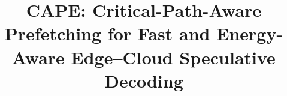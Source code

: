 \documentclass[conference]{IEEEtran}
\begin{document}
\title{CAPE: Critical-Path-Aware Prefetching for Fast and Energy-Aware Edge--Cloud Speculative Decoding}

\author{
}

\maketitle














\appendices

\end{document}
